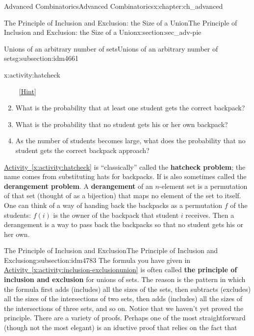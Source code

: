 \documentclass[oneside,10pt,]{book}
\newcommand{\terminology}[1]{\textbf{#1}}
\numberwithin{equation}{chapter}
\begin{document}
\begin{chapterptx}{Advanced Combinatorics}{}{Advanced Combinatorics}{}{}{x:chapter:ch_advanced}
\begin{sectionptx}{The Principle of Inclusion and Exclusion: the Size of a Union}{}{The Principle of Inclusion and Exclusion: the Size of a Union}{}{}{x:section:sec_adv-pie}
\begin{subsectionptx}{Unions of an arbitrary number of sets}{}{Unions of an arbitrary number of sets}{}{}{g:subsection:idm4661}
\begin{activity}{}{x:activity:hatcheck}
\begin{enumerate}[font=\bfseries,label=(\alph*),ref=\alph*]
\qquad~\hfill{\tiny\hyperlink{g:hint:idm4713-back}{[Hint]}}\item{}What is the probability that at least one student gets the correct backpack?%
\item\label{x:task:hatcheckprobpart}What is the probability that no student gets his or her own backpack?%
\item{}As the number of students becomes large, what does the probability that no student gets the correct backpack approach?%
\end{enumerate}
\end{activity}
\hyperref[x:activity:hatcheck]{Activity~\ref{x:activity:hatcheck}} is ``classically'' called the \terminology{hatcheck problem}; the name comes from substituting hats for backpacks. If is also sometimes called the \terminology{derangement problem}. A \terminology{derangement} of an \(n\)-element set is a permutation of that set (thought of as a bijection) that maps no element of the set to itself. One can think of a way of handing back the backpacks as a permutation \(f\) of the students: \(f(i)\) is the owner of the backpack that student \(i\) receives. Then a derangement is a way to pass back the backpacks so that no student gets his or her own.%
\end{subsectionptx}
%
%
\typeout{************************************************}
\typeout{************************************************}
%
\begin{subsectionptx}{The Principle of Inclusion and Exclusion}{}{The Principle of Inclusion and Exclusion}{}{}{g:subsection:idm4783}
The formula you have given in \hyperref[x:activity:inclusion-exclusionunion]{Activity~\ref{x:activity:inclusion-exclusionunion}} is often called \terminology{the principle of inclusion and exclusion} for unions of sets. The reason is the pattern in which the formula first adds (includes) all the sizes of the sets, then subtracts (excludes) all the sizes of the intersections of two sets, then adds (includes) all the sizes of the intersections of three sets, and so on.   Notice that we haven't yet proved the principle. There are a variety of proofs.  Perhaps one of the most straightforward (though not the most elegant) is an iductive proof that relies on the fact that%
\begin{equation*}

\end{equation*}
\end{subsectionptx}
\end{sectionptx}
\end{chapterptx}
\end{document}
